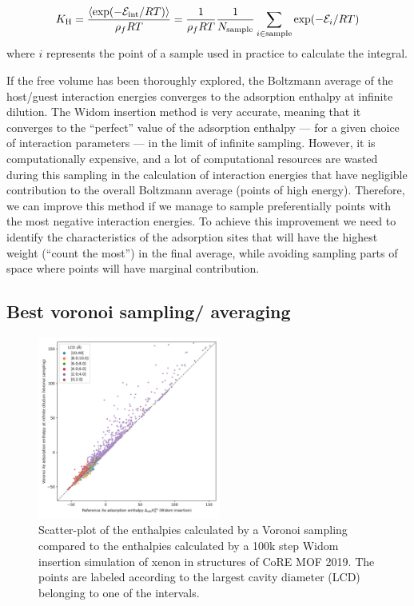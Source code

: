 \documentclass[main]{subfiles}
\begin{document}
\begin{equation}
\label{eq:henry}
    K_{\text{H}} = \dfrac{\langle \exp(-\mathcal{E}_{\text{int}}/RT) \rangle}{\rho_f RT} = \dfrac{1}{\rho_f RT}\dfrac{1}{N_{\text{sample}}} \sum_{i\in \text{sample}} \exp(-\mathcal{E}_i/RT)
\end{equation}
{where $i$ represents the point of a sample used in practice to calculate the integral.}

If the free volume has been thoroughly explored, the Boltzmann average of the host/guest interaction energies converges to the adsorption enthalpy at infinite dilution. The Widom insertion method is very accurate, meaning that it converges to the ``perfect'' value of the adsorption enthalpy --- for a given choice of interaction parameters --- in the limit of infinite sampling. However, it is computationally expensive, and a lot of computational resources are wasted during this sampling in the calculation of interaction energies that have negligible contribution to the overall Boltzmann average (points of high energy). Therefore, we can improve this method if we manage to sample preferentially points with the most negative interaction energies. To achieve this improvement we need to identify the characteristics of the adsorption sites that will have the highest weight (``count the most'') in the final average, while avoiding sampling parts of space where points will have marginal contribution.


\subsection{Best voronoi sampling/ averaging}

\begin{figure}[ht]
    \centering
        \includegraphics[width=6cm]{figures/3-fastsim/H_Xe_0_vs_E_voro_B_overview.jpeg}
        \caption{Scatter-plot of the enthalpies calculated by a Voronoi sampling compared to the enthalpies calculated by a 100k step Widom insertion simulation of xenon in structures of CoRE MOF 2019. The points are labeled according to the largest cavity diameter (LCD) belonging to one of the intervals.}
        \label{fgr:voronoi}
\end{figure}
\end{document}
